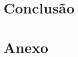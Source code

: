 \documentclass[12pt, a4paper, twoside]{article}
\numberwithin{equation}{subsection} %
\begin{document}




% 


% 

% 



% 

\section{\textbf{Conclusão}}
\newpage




\section{\textbf{Anexo}}
\newpage
\end{document}
